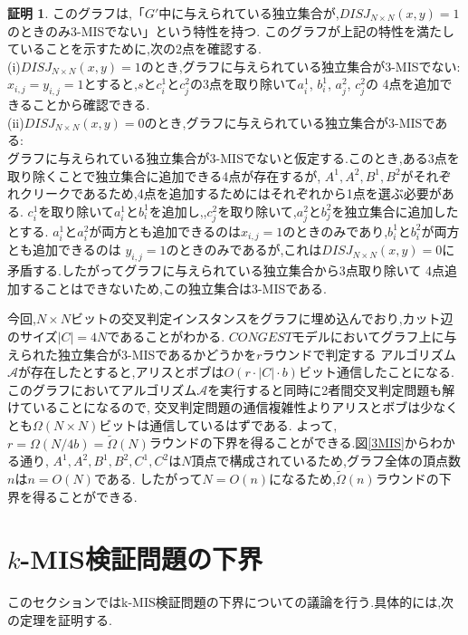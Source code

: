 \documentclass[12pt]{thesis}
\theoremstyle{definition}
\newtheorem*{prf*}{証明}
\begin{document}
\begin{prf*}
このグラフは,「$G'$中に与えられている独立集合が,$DISJ_{N \times N} (x, y) = 1$のときのみ3-MISでない」という特性を持つ. 
このグラフが上記の特性を満たしていることを示すために,次の2点を確認する. \\
(i)$DISJ_{N \times N} (x, y) = 1$のとき,グラフに与えられている独立集合が3-MISでない: \\
$x_{i, j} = y_{i, j} =1$とすると,$s$と$c_{i}^{1}$と$c_{j}^{2}$の3点を取り除いて$a_{i}^{1}$, $b_{i}^{1}$, $a_{j}^{2}$, $c_{j}^{2}$の
4点を追加できることから確認できる. \\
(ii)$DISJ_{N \times N} (x, y) = 0$のとき,グラフに与えられている独立集合が3-MISである: \\ 
グラフに与えられている独立集合が3-MISでないと仮定する.このとき,ある3点を取り除くことで独立集合に追加できる4点が存在するが,
$A^{1}, A^{2}, B^{1}, B^{2}$がそれぞれクリークであるため,4点を追加するためにはそれぞれから1点を選ぶ必要がある.
$c_{i}^{1}$を取り除いて$a_{i}^{1}$と$b_{i}^{1}$を追加し,,$c_{j}^{2}$を取り除いて,$a_{j}^{2}$と$b_{j}^{2}$を独立集合に追加したとする.
$a_{i}^{1}$と$a_{i}^{2}$が両方とも追加できるのは$x_{i, j} = 1$のときのみであり,$b_{i}^{1}$と$b_{i}^{2}$が両方とも追加できるのは
$y_{i, j} = 1$のときのみであるが,これは$DISJ_{N \times N} (x, y) = 0$に矛盾する.したがってグラフに与えられている独立集合から3点取り除いて
4点追加することはできないため,この独立集合は3-MISである.

今回,$N \times N$ビットの交叉判定インスタンスをグラフに埋め込んでおり,カット辺のサイズ$|C| = 4N$であることがわかる.
$CONGEST$モデルにおいてグラフ上に与えられた独立集合が3-MISであるかどうかを$r$ラウンドで判定する
アルゴリズム$\mathcal{A}$が存在したとすると,アリスとボブは$O(r \cdot |C| \cdot b)$ビット通信したことになる.
このグラフにおいてアルゴリズム$\mathcal{A}$を実行すると同時に2者間交叉判定問題も解けていることになるので,
交叉判定問題の通信複雑性よりアリスとボブは少なくとも$\Omega (N \times N)$ビットは通信しているはずである.
よって,$r = \Omega (N / 4b) = \tilde{\Omega}(N)$ラウンドの下界を得ることができる.図\ref{3MIS}からわかる通り,
$A^{1}, A^{2}, B^{1}, B^{2}, C^{1}, C^{2}$は$N$頂点で構成されているため,グラフ全体の頂点数$n$は$n = O(N)$である.
したがって$N = O(n)$になるため,$\tilde{\Omega}(n)$ラウンドの下界を得ることができる. 
\end{prf*}
\newpage

\section{$k$-MIS検証問題の下界}
このセクションではk-MIS検証問題の下界についての議論を行う.具体的には,次の定理を証明する.
\end{document}
